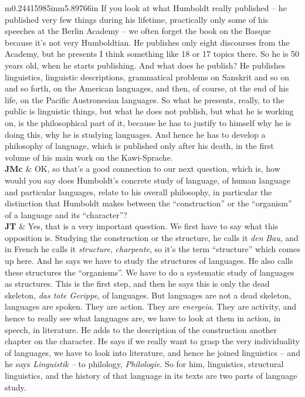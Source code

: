 \documentclass[12pt]{article}
\begin{document}
\begin{flushleft}
\begin{supertabular}{m{0.24415985in}m{5.89766in}}
If you look at what Humboldt really published – he published very few things during his lifetime, practically only some of his speeches at the Berlin Academy – we often forget the book on the Basque because it’s not very Humboldtian. He publishes only eight discourses from the Academy, but he presents I think something like 18 or 17 topics there. So he is 50 years old, when he starts publishing. And what does he publish? He publishes linguistics, linguistic descriptions, grammatical problems on Sanskrit and so on and so forth, on the American languages, and then, of course, at the end of his life, on the Pacific Austronesian languages. So what he presents, really, to the public is linguistic things, but what he does not publish, but what he is working on, is the philosophical part of it, because he has to justify to himself why he is doing this, why he is studying languages. And hence he has to develop a philosophy of language, which is published only after his death, in the first volume of his main work on the Kawi-Sprache.\\
\textbf{JMc}\newline
 &
OK, so that’s a good connection to our next question, which is, how would you say does Humboldt’s concrete study of language, of human language and particular languages, relate to his overall philosophy, in particular the distinction that Humboldt makes between the “construction” or the “organism” of a language and its “character”?\\
\textbf{JT}\newline
 &
Yes, that is a very important question. We first have to say what this opposition is. Studying the construction or the structure, he calls it \textit{den} \textit{Bau}, and in French he calls it \textit{structure}, \textit{charpente}, so it’s the term “structure” which comes up here. And he says we have to study the structures of languages. He also calls these structures the “organisms”. We have to do a systematic study of languages as structures. This is the first step, and then he says this is only the dead skeleton, \textit{das tote Gerippe}, of languages. But languages are not a dead skeleton, languages are spoken. They are action. They are \textit{energeia}. They are activity, and hence to really see what languages are, we have to look at them in action, in speech, in literature. He adds to the description of the construction another chapter on the character. He says if we really want to grasp the very individuality of languages, we have to look into literature, and hence he joined linguistics – and he says \textit{Linguistik –} to philology, \textit{Philologie}. So for him, linguistics, structural linguistics, and the history of that language in its texts are two parts of language study. 


\end{supertabular}
\end{flushleft}
\end{document}
